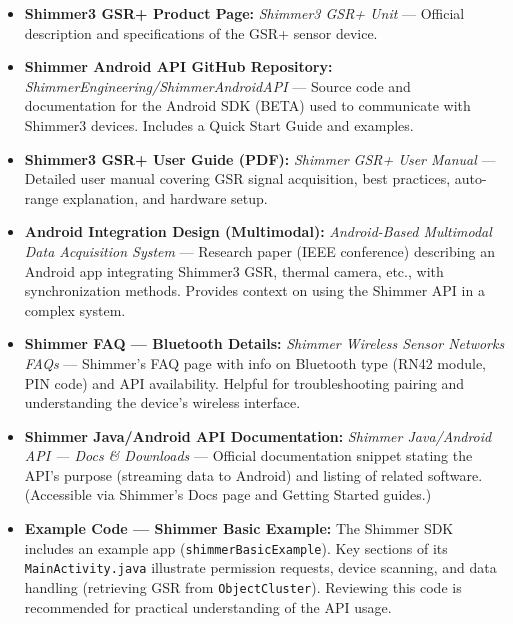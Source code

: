 \begin{itemize}
\item \textbf{Shimmer3 GSR+ Product Page:} \textit{Shimmer3 GSR+ Unit} --- Official
  description and specifications of the GSR+ sensor
  device\cite{Boucsein2012}\cite{AppleHealthWatch2019}.
\item \textbf{Shimmer Android API GitHub Repository:}
  \textit{ShimmerEngineering/ShimmerAndroidAPI} --- Source code and
  documentation for the Android SDK (BETA) used to communicate with
  Shimmer3
  devices\cite{GSRFacialThermal2021}.
  Includes a Quick Start Guide and examples.
\item \textbf{Shimmer3 GSR+ User Guide (PDF):} \textit{Shimmer GSR+ User Manual} ---
  Detailed user manual covering GSR signal acquisition, best practices,
  auto-range explanation, and hardware
  setup\cite{WebcamCapture}\cite{ShimmerManager}.
\item \textbf{Android Integration Design (Multimodal):} \textit{Android-Based Multimodal
  Data Acquisition System} --- Research paper (IEEE conference)
  describing an Android app integrating Shimmer3 GSR, thermal camera,
  etc., with synchronization
  methods\cite{DeviceServer}\cite{DeviceServer}.
  Provides context on using the Shimmer API in a complex system.
\item \textbf{Shimmer FAQ --- Bluetooth Details:} \textit{Shimmer Wireless Sensor
  Networks FAQs} --- Shimmer's FAQ page with info on Bluetooth type (RN42
  module, PIN code) and API
  availability\cite{StressDefinitionHH}\cite{ElectrodermalActivityWiki}.
  Helpful for troubleshooting pairing and understanding the device's
  wireless interface.
\item \textbf{Shimmer Java/Android API Documentation:} \textit{Shimmer Java/Android API
  --- Docs & Downloads} --- Official documentation snippet stating the
  API's purpose (streaming data to Android) and listing of related
  software. (Accessible via Shimmer's Docs page and Getting Started
  guides.)
\item \textbf{Example Code --- Shimmer Basic Example:} The Shimmer SDK includes an
  example app (\texttt{shimmerBasicExample}). Key sections of its
  \texttt{MainActivity.java} illustrate permission
  requests\cite{ElectrodermalActivityWiki},
  device
  scanning\cite{DeviceServer},
  and data handling (retrieving GSR from
  \texttt{ObjectCluster})\cite{ContactlessStressThermal2022}\cite{InstantStressSmartphone2019}.
  Reviewing this code is recommended for practical understanding of the
  API usage.

\end{itemize}

